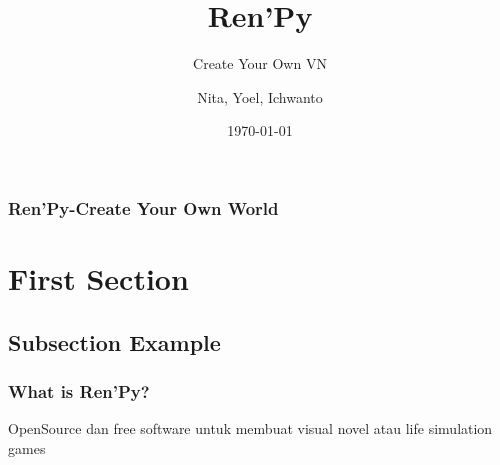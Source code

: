\documentclass[pdf]{beamer}
\title[Short title]{Ren'Py} %
\subtitle{Create Your Own VN}
\author{Nita, Yoel, Ichwanto} %
\institute[Petra Christian University] %
{
Petra Christian University \\ %
\medskip
\textit{m...@john.petra.ac.id} %
}
\date{\today} %
\begin{document}
\begin{frame}
\titlepage %
\end{frame}

\begin{frame}
\frametitle{Ren'Py-Create Your Own World} %
\tableofcontents %
\end{frame}


\section{First Section} %

\subsection{Subsection Example} %

\begin{frame}
\frametitle{What is Ren'Py?}
OpenSource dan free software untuk membuat visual novel atau life simulation games

\end{frame}
\end{document}
